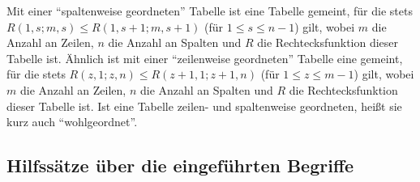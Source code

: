 \begin{definition}
    Mit einer "`spaltenweise geordneten"' Tabelle ist eine Tabelle gemeint, für die stets $R(1, s; m, s)\leq 
    R(1, s+1; m, s+1)$ (für $1\leq s\leq n-1$) gilt, wobei $m$ die Anzahl an Zeilen, $n$ die Anzahl an Spalten und 
    $R$ die Rechtecksfunktion dieser Tabelle ist. Ähnlich ist mit einer "`zeilenweise geordneten"' Tabelle eine 
    gemeint, für die stets $R(z, 1; z, n)\leq R(z+1, 1; z+1, n)$ (für $1\leq z\leq m-1$) gilt, wobei $m$ die Anzahl 
    an Zeilen, $n$ die Anzahl an Spalten und $R$ die Rechtecksfunktion dieser Tabelle ist. Ist eine Tabelle zeilen- 
    und spaltenweise geordneten, heißt sie kurz auch "`wohlgeordnet"'.
\end{definition}

\subsection*{Hilfssätze über die eingeführten Begriffe}

\renewcommand{\qedsymbol}{$\square$}

